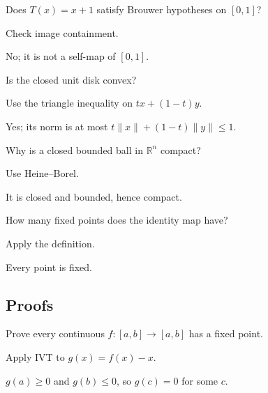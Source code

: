\begin{exercise}\label{exr:ii17-expand-02}
Does \(T(x)=x+1\) satisfy Brouwer hypotheses on \([0,1]\)?
\end{exercise}
\begin{hint}
Check image containment.
\end{hint}
\begin{solution}
No; it is not a self-map of \([0,1]\).
\end{solution}

\begin{exercise}[Convexity]\label{exr:ii17-expand-03}
Is the closed unit disk convex?
\end{exercise}
\begin{hint}
Use the triangle inequality on \(tx+(1-t)y\).
\end{hint}
\begin{solution}
Yes; its norm is at most \(t\|x\|+(1-t)\|y\|\le1\).
\end{solution}

\begin{exercise}[Compactness]\label{exr:ii17-expand-04}
Why is a closed bounded ball in \(\mathbb R^n\) compact?
\end{exercise}
\begin{hint}
Use Heine--Borel.
\end{hint}
\begin{solution}
It is closed and bounded, hence compact.
\end{solution}

\begin{exercise}\label{exr:ii17-expand-05}
How many fixed points does the identity map have?
\end{exercise}
\begin{hint}
Apply the definition.
\end{hint}
\begin{solution}
Every point is fixed.
\end{solution}

\subsection*{Proofs}

\begin{exercise}\label{exr:ii17-expand-06}
Prove every continuous \(f:[a,b]\to[a,b]\) has a fixed point.
\end{exercise}
\begin{hint}
Apply IVT to \(g(x)=f(x)-x\).
\end{hint}
\begin{solution}
\(g(a)\ge0\) and \(g(b)\le0\), so \(g(c)=0\) for some \(c\).
\end{solution}

